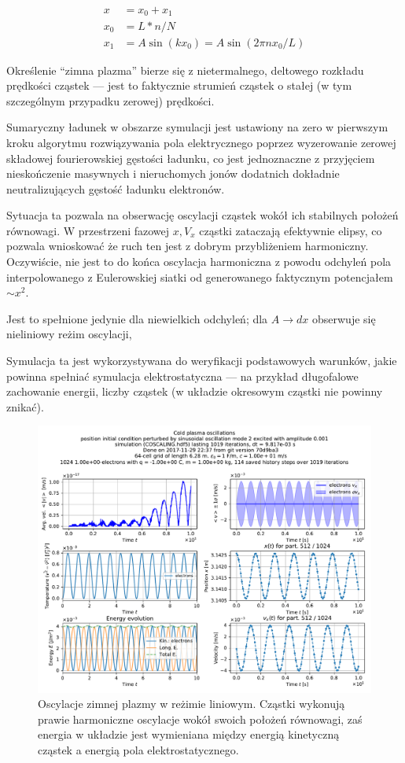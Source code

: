 \begin{align}
x &= x_0 + x_1\\
x_0 &= L * n / N\\
x_1 &= A  \sin(k x_0) = A \sin(2 \pi n x_0 / L)
\end{align}

Określenie ``zimna plazma'' bierze się z nietermalnego, deltowego
rozkładu prędkości cząstek --- jest to faktycznie strumień cząstek o stałej
(w tym szczególnym przypadku zerowej) prędkości.

Sumaryczny ładunek w obszarze symulacji jest ustawiony na zero w pierwszym
kroku algorytmu rozwiązywania pola elektrycznego poprzez wyzerowanie zerowej
składowej fourierowskiej gęstości ładunku, co jest jednoznaczne z przyjęciem
nieskończenie masywnych i nieruchomych jonów dodatnich dokładnie
neutralizujących gęstość ładunku elektronów.

Sytuacja ta
pozwala na obserwację oscylacji cząstek wokół ich stabilnych położeń
równowagi. W przestrzeni fazowej $x, V_x$ cząstki zataczają efektywnie
elipsy, co pozwala wnioskować że ruch ten jest z dobrym przybliżeniem harmoniczny.
Oczywiście, nie jest to do końca oscylacja harmoniczna z powodu odchyleń pola interpolowanego
z Eulerowskiej siatki od generowanego faktycznym potencjałem $ \sim x^2 $.

Jest to spełnione jedynie dla niewielkich odchyleń; dla $A \to
dx$ obserwuje się nieliniowy reżim oscylacji, 

Symulacja ta jest wykorzystywana do weryfikacji podstawowych warunków, jakie powinna spełniać
symulacja elektrostatyczna --- na przykład długofalowe zachowanie energii, liczby cząstek (w układzie okresowym cząstki nie powinny
znikać).

\begin{figure}[h!]
  \includegraphics[width=\textwidth]{Images/COSCALING}
  \caption{Oscylacje zimnej plazmy w reżimie liniowym. Cząstki wykonują prawie harmoniczne oscylacje wokół swoich położeń równowagi, zaś energia
   w układzie jest wymieniana między energią kinetyczną cząstek a energią pola elektrostatycznego.\label{fig:coldplasma-linear}}
\end{figure}

